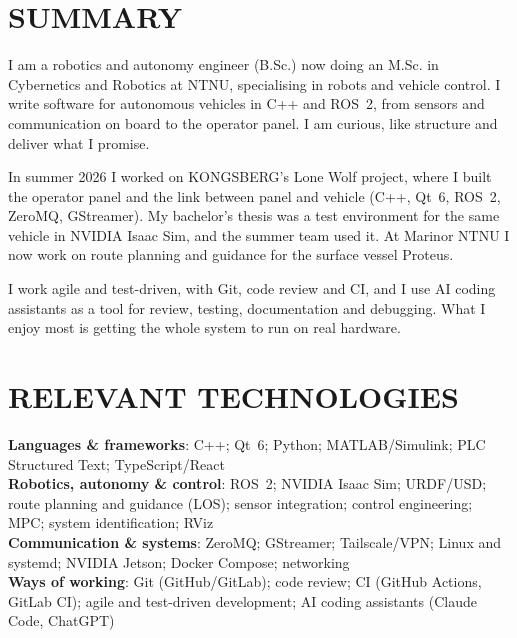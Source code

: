 \documentclass[a4paper,11pt]{article}
\newcommand{\resumeBlockStart}{\begin{itemize}[leftmargin=0in, label={}]}
\newcommand{\resumeBlockEnd}{\end{itemize}}
\begin{document}
\section{SUMMARY}
\resumeBlockStart
  \small{\item{
I am a robotics and autonomy engineer (B.Sc.) now doing an M.Sc. in Cybernetics and Robotics at NTNU, specialising in robots and vehicle control. I write software for autonomous vehicles in C++ and ROS~2, from sensors and communication on board to the operator panel. I am curious, like structure and deliver what I promise.
\vspace{2pt}

In summer 2026 I worked on KONGSBERG's Lone Wolf project, where I built the operator panel and the link between panel and vehicle (C++, Qt~6, ROS~2, ZeroMQ, GStreamer). My bachelor's thesis was a test environment for the same vehicle in NVIDIA Isaac Sim, and the summer team used it. At Marinor NTNU I now work on route planning and guidance for the surface vessel Proteus.
\vspace{2pt}

I work agile and test-driven, with Git, code review and CI, and I use AI coding assistants as a tool for review, testing, documentation and debugging. What I enjoy most is getting the whole system to run on real hardware.
  }}
\resumeBlockEnd

\section{RELEVANT TECHNOLOGIES}
\resumeBlockStart
  \small{\item{
    \textbf{Languages \& frameworks}{: C++; Qt~6; Python; MATLAB/Simulink; PLC Structured Text; TypeScript/React}\vspace{3pt} \\
    \textbf{Robotics, autonomy \& control}{: ROS~2; NVIDIA Isaac Sim; URDF/USD; route planning and guidance (LOS); sensor integration; control engineering; MPC; system identification; RViz}\vspace{3pt} \\
    \textbf{Communication \& systems}{: ZeroMQ; GStreamer; Tailscale/VPN; Linux and systemd; NVIDIA Jetson; Docker Compose; networking}\vspace{3pt} \\
    \textbf{Ways of working}{: Git (GitHub/GitLab); code review; CI (GitHub Actions, GitLab CI); agile and test-driven development; AI coding assistants (Claude Code, ChatGPT)}
  }}
\resumeBlockEnd
\end{document}
